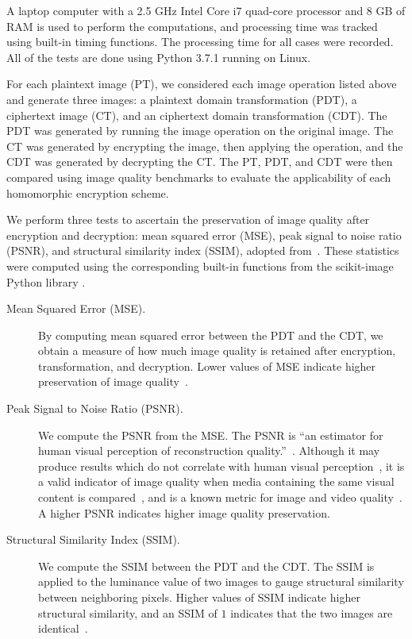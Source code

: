 A laptop computer with a 2.5 GHz Intel Core i7 quad-core processor and 8 GB of RAM is used to perform the computations, and processing time was tracked using built-in timing functions. The processing time for all cases were recorded. All of the tests are done using Python 3.7.1 running on Linux.

For each plaintext image (PT), we considered each image operation listed above and generate three images: a plaintext domain transformation (PDT), a ciphertext image (CT), and an ciphertext domain transformation (CDT). The PDT was generated by running the image operation on the original image. The CT was generated by encrypting the image, then applying the operation, and the CDT was generated by decrypting the CT. The PT, PDT, and CDT were then compared using image quality benchmarks to evaluate the applicability of each homomorphic encryption scheme.

We perform three tests to ascertain the preservation of image quality after encryption and decryption: mean squared error (MSE), peak signal to noise ratio (PSNR), and structural similarity index (SSIM), adopted from~\cite{ahmed_benchmark_2016, ahmad_efficiency_2012, wu_npcr_2011}. These statistics were computed using the corresponding built-in functions from the scikit-image Python library \cite{scikit-image}.
\begin{description}
	\item [Mean Squared Error (MSE).]
	By computing mean squared error between the PDT and the CDT, we obtain a measure of how much image quality is retained after encryption, transformation, and decryption. Lower values of MSE indicate higher preservation of image quality~\cite{ahmed_benchmark_2016, ahmad_efficiency_2012}.
	\item [Peak Signal to Noise Ratio (PSNR).]
	We compute the PSNR from the MSE. The PSNR is ``an estimator for human visual perception of reconstruction quality.''~\cite{ahmed_benchmark_2016}. Although it may produce results which do not correlate with human visual perception~\cite{huynh-thu_accuracy_2012, ahmed_benchmark_2016}, it is a valid indicator of image quality when media containing the same visual content is compared~\cite{huynh-thu_accuracy_2012}, and is a known metric for image and video quality~\cite{upmanyu_efficient_2009, jain_image_2016, akramullah_video_2014}. A higher PSNR indicates higher image quality preservation.
	\item [Structural Similarity Index (SSIM).]
	We compute the SSIM between the PDT and the CDT. The SSIM is applied to the luminance value of two images to gauge structural similarity between neighboring pixels. Higher values of SSIM indicate higher structural similarity, and an SSIM of $1$ indicates that the two images are identical~\cite{ahmed_benchmark_2016}.
\end{description}
